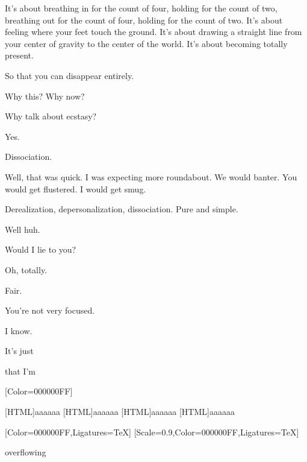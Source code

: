 \begin{paracol}{2}
\begin{leftcolumn}
It's about breathing in for the count of four, holding for the count of two, breathing out for the count of four, holding for the count of two. It's about feeling where your feet touch the ground. It's about drawing a straight line from your center of gravity to the center of the world. It's about becoming totally present.

\begin{ally}
So that you can disappear entirely.
\end{ally}
\newpage
\begin{ally}
Why this? Why now?
\end{ally} %

\noindent Why talk about ecstasy?

\begin{ally}
Yes.
\end{ally}
\noindent Dissociation.

\begin{ally}
Well, that was quick. I was expecting more roundabout. We would banter. You would get flustered. I would get smug.
\end{ally}
\noindent Derealization, depersonalization, dissociation. Pure and simple.

\begin{ally}
Well huh.
\end{ally}
\noindent Would I lie to you?

\begin{ally}
Oh, totally.
\end{ally}
\noindent Fair.
\newpage

\begin{ally}
You're not very focused.
\end{ally}
\vfill

\noindent I know.

\vfill

\noindent It's just

\vfill

\noindent that I'm
\newpage
\end{leftcolumn}
\end{paracol}


\renewfontfamily{}[Color=000000FF]

[HTML]{aaaaaa}
[HTML]{aaaaaa}
[HTML]{aaaaaa}
[HTML]{aaaaaa}
\begin{paracol}{2}
[Color=000000FF,Ligatures=TeX]
\renewfontfamily{}[Scale=0.9,Color=000000FF,Ligatures=TeX]
\null
\vfill
\begin{center}
  overflowing
\end{center}
\vfill
\newpage
\end{paracol}


